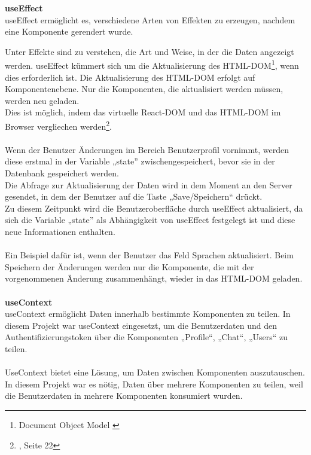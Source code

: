 
\textbf{useEffect}
\\
useEffect ermöglicht es, verschiedene Arten von Effekten zu erzeugen, nachdem eine Komponente gerendert wurde.

Unter Effekte sind zu verstehen, die Art und Weise, in der die Daten angezeigt werden. useEffect kümmert sich um die Aktualisierung des HTML-DOM\footnote{Document Object Model {\cite{MO2}}}, wenn dies erforderlich ist. Die Aktualisierung des HTML-DOM erfolgt auf Komponentenebene. Nur die Komponenten, die aktualisiert werden müssen, werden neu geladen.
\\
Dies ist möglich, indem  das virtuelle React-DOM{\cite{R06}} und das HTML-DOM im Browser vergliechen werden\footnote{{\cite{AN1}, Seite 22}}.
\\\\
Wenn der Benutzer Änderungen im Bereich Benutzerprofil vornimmt, werden diese erstmal in der Variable „state” zwischengespeichert, bevor sie in der Datenbank gespeichert werden.
\\
Die Abfrage zur Aktualisierung der Daten wird in dem Moment an den Server gesendet, in dem der Benutzer auf die Taste „Save/Speichern“ drückt.
\\
Zu diesem Zeitpunkt wird die Benutzeroberfläche durch useEffect aktualisiert, da sich die Variable „state” als Abhängigkeit von useEffect festgelegt ist und diese neue Informationen enthalten.
\\\\
Ein Beispiel dafür ist, wenn der Benutzer das Feld Sprachen aktualisiert. Beim Speichern der Änderungen werden nur die Komponente, die mit der vorgenommenen Änderung zusammenhängt, wieder in das HTML-DOM geladen.
\\\\

\textbf{useContext}
\\
useContext ermöglicht Daten innerhalb bestimmte Komponenten zu teilen.
In diesem Projekt war useContext eingesetzt, um die Benutzerdaten und den Authentifizierungstoken über die Komponenten  „Profile“, „Chat“, „Users“ zu teilen.
\\\\
UseContext bietet eine Lösung, um Daten zwischen Komponenten auszutauschen.{\cite{R04}}
\\
In diesem Projekt war es nötig, Daten über mehrere Komponenten zu teilen, weil die Benutzerdaten in mehrere Komponenten konsumiert wurden.

